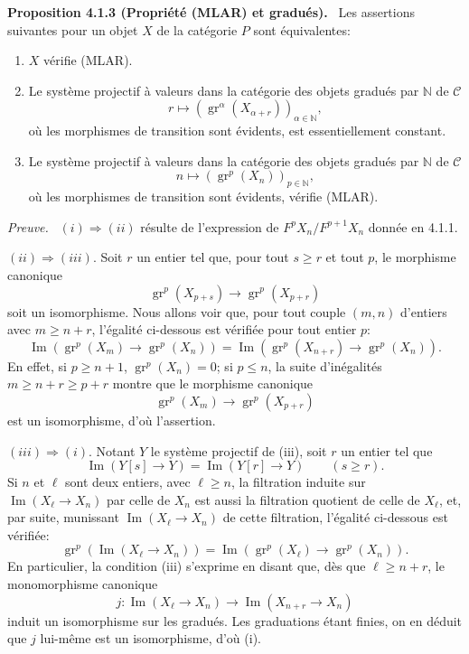 \documentclass[11pt]{article}
\providecommand{\NN}{\mathbb{N}}
\newenvironment{statement}[1]{\par\medskip\noindent\textbf{#1.}\ }{\par\medskip}
\newenvironment{prooftext}[1][Proof]{\par\noindent\emph{#1.}\ }{\par\medskip}
\providecommand{\gr}{\operatorname{gr}}
\providecommand{\NN}{\mathbb N}
\providecommand{\cC}{\mathcal C}
\providecommand{\Im}{\operatorname{Im}}
\providecommand{\gr}{\operatorname{gr}}
\renewcommand{\Im}{\operatorname{Im}}
\providecommand{\gr}{\operatorname{gr}}
\providecommand{\Im}{\operatorname{Im}}
\begin{document}
\begin{statement}{Proposition 4.1.3 (Propriété (MLAR) et gradués)}
Les assertions suivantes pour un objet $X$ de la catégorie $P$ sont équivalentes:
\begin{enumerate}[label=(\roman*)]
\item $X$ vérifie (MLAR).
\item Le système projectif à valeurs dans la catégorie des objets gradués par $\NN$ de $\cC$
\[
r\longmapsto (\gr^\alpha(X_{\alpha+r}))_{\alpha\in\NN},
\]
où les morphismes de transition sont évidents, est essentiellement constant.
\item Le système projectif à valeurs dans la catégorie des objets gradués par $\NN$ de $\cC$
\[
n\longmapsto (\gr^p(X_n))_{p\in\NN},
\]
où les morphismes de transition sont évidents, vérifie (MLAR).
\end{enumerate}
\end{statement}

\begin{prooftext}[Preuve]
$(i)\Rightarrow(ii)$ résulte de l'expression de $F^pX_n/F^{p+1}X_n$ donnée en 4.1.1.

$(ii)\Rightarrow(iii)$. Soit $r$ un entier tel que, pour tout $s\ge r$ et tout $p$, le morphisme canonique
\[
\gr^p(X_{p+s})\longrightarrow \gr^p(X_{p+r})
\]
soit un isomorphisme. Nous allons voir que, pour tout couple $(m,n)$ d'entiers avec $m\ge n+r$, l'égalité ci-dessous est vérifiée pour tout entier $p$:
\[
\Im(\gr^p(X_m)\to\gr^p(X_n))=
\Im(\gr^p(X_{n+r})\to\gr^p(X_n)).
\]
En effet, si $p\ge n+1$, $\gr^p(X_n)=0$; si $p\le n$, la suite d'inégalités $m\ge n+r\ge p+r$ montre que le morphisme canonique
\[
\gr^p(X_m)\longrightarrow\gr^p(X_{p+r})
\]
est un isomorphisme, d'où l'assertion.

$(iii)\Rightarrow(i)$. Notant $Y$ le système projectif de (iii), soit $r$ un entier tel que
\[
\Im(Y[s]\to Y)=\Im(Y[r]\to Y)\qquad(s\ge r).
\]
Si $n$ et $\ell$ sont deux entiers, avec $\ell\ge n$, la filtration induite sur $\Im(X_\ell\to X_n)$ par celle de $X_n$ est aussi la filtration quotient de celle de $X_\ell$, et, par suite, munissant $\Im(X_\ell\to X_n)$ de cette filtration, l'égalité ci-dessous est vérifiée:
\[
\gr^p(\Im(X_\ell\to X_n))=
\Im(\gr^p(X_\ell)\to\gr^p(X_n)).
\]
En particulier, la condition (iii) s'exprime en disant que, dès que $\ell\ge n+r$, le monomorphisme canonique
\[
j:\Im(X_\ell\to X_n)\longrightarrow\Im(X_{n+r}\to X_n)
\]
induit un isomorphisme sur les gradués. Les graduations étant finies, on en déduit que $j$ lui-même est un isomorphisme, d'où (i).
\end{prooftext}
\end{document}

